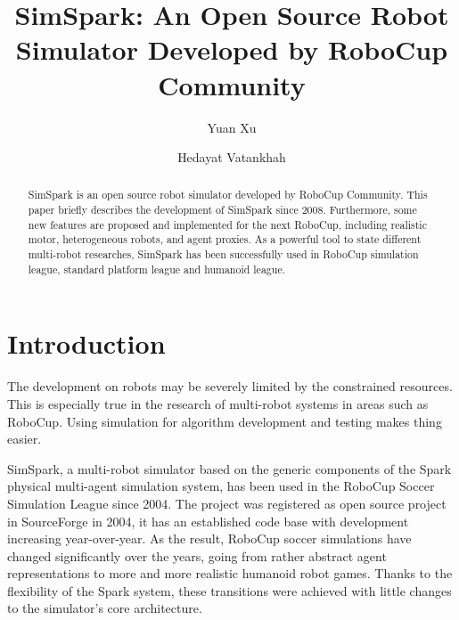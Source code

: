 \documentclass{llncs}
\begin{document}
\title{SimSpark: An Open Source Robot Simulator Developed by RoboCup Community}

\author{Yuan Xu \and Hedayat Vatankhah}


\maketitle

\begin{abstract}
  SimSpark is an open source robot simulator developed by RoboCup Community.
  This paper briefly describes the development of SimSpark since 2008.
  Furthermore, some new features are proposed and implemented for the next RoboCup, including realistic motor, heterogeneous robots, and agent proxies.
  As a powerful tool to state different multi-robot researches, SimSpark has been successfully used in RoboCup simulation league, standard platform league and humanoid league.
\end{abstract}

\section{Introduction}
The development on robots may be severely limited by the constrained resources.
This is especially true in the research of multi-robot systems in areas such as RoboCup.
Using simulation for algorithm development and testing makes thing easier.

SimSpark, a multi-robot simulator based on the generic components of the Spark\cite{OR05} physical multi-agent simulation system, has been used in the RoboCup Soccer Simulation League since 2004.
The project was registered as open source project in SourceForge in 2004, it has an established code base with development increasing year-over-year.
As the result, RoboCup soccer simulations have changed significantly over the years, going from rather abstract agent representations to more and more realistic humanoid robot games\cite{Boedecker2008,usermanual}.
Thanks to the flexibility of the Spark system, these transitions were achieved with little changes to the simulator's core architecture.
\end{document}
